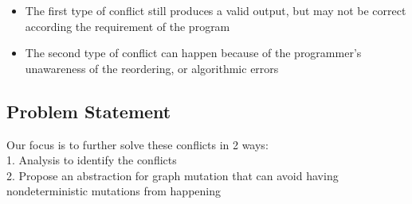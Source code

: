 \begin{frame}
\begin{itemize}
\item The first type of conflict still produces a valid output, but may not be correct according the requirement of the program
\linebreak
\item The second type of conflict can happen because of the programmer's unawareness of the reordering, or algorithmic errors
\end{itemize} 
\end{frame}

\subsection{Problem Statement}
\begin{frame}
Our focus is to further solve these conflicts in 2 ways:
	\linebreak
	\\ 1. Analysis to identify the conflicts
	\linebreak
	\\ 2. Propose an abstraction for graph mutation that can avoid having nondeterministic mutations from happening
\end{frame}
